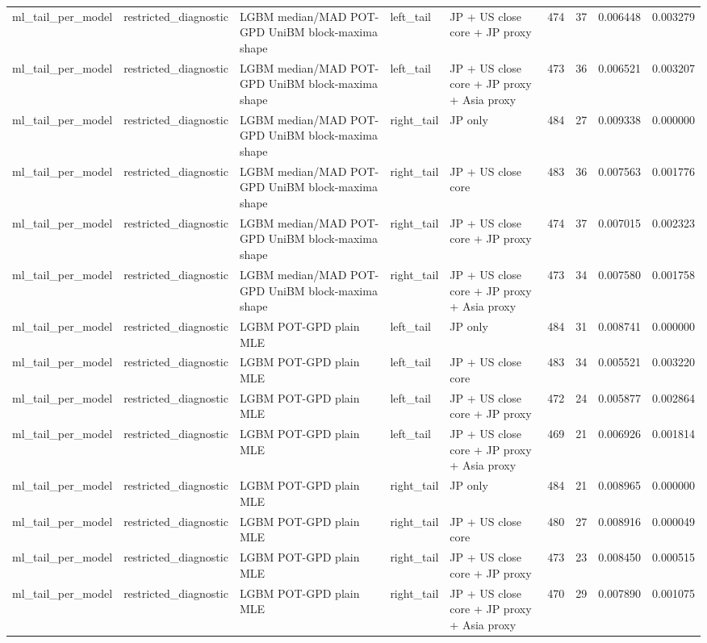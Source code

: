 \begin{tabular}{lllllrrrr}
ml\_tail\_per\_model & restricted\_diagnostic & LGBM median/MAD POT-GPD UniBM block-maxima shape & left\_tail & JP + US close core + JP proxy & 474 & 37 & 0.006448 & 0.003279 \\
ml\_tail\_per\_model & restricted\_diagnostic & LGBM median/MAD POT-GPD UniBM block-maxima shape & left\_tail & JP + US close core + JP proxy + Asia proxy & 473 & 36 & 0.006521 & 0.003207 \\
ml\_tail\_per\_model & restricted\_diagnostic & LGBM median/MAD POT-GPD UniBM block-maxima shape & right\_tail & JP only & 484 & 27 & 0.009338 & 0.000000 \\
ml\_tail\_per\_model & restricted\_diagnostic & LGBM median/MAD POT-GPD UniBM block-maxima shape & right\_tail & JP + US close core & 483 & 36 & 0.007563 & 0.001776 \\
ml\_tail\_per\_model & restricted\_diagnostic & LGBM median/MAD POT-GPD UniBM block-maxima shape & right\_tail & JP + US close core + JP proxy & 474 & 37 & 0.007015 & 0.002323 \\
ml\_tail\_per\_model & restricted\_diagnostic & LGBM median/MAD POT-GPD UniBM block-maxima shape & right\_tail & JP + US close core + JP proxy + Asia proxy & 473 & 34 & 0.007580 & 0.001758 \\
ml\_tail\_per\_model & restricted\_diagnostic & LGBM POT-GPD plain MLE & left\_tail & JP only & 484 & 31 & 0.008741 & 0.000000 \\
ml\_tail\_per\_model & restricted\_diagnostic & LGBM POT-GPD plain MLE & left\_tail & JP + US close core & 483 & 34 & 0.005521 & 0.003220 \\
ml\_tail\_per\_model & restricted\_diagnostic & LGBM POT-GPD plain MLE & left\_tail & JP + US close core + JP proxy & 472 & 24 & 0.005877 & 0.002864 \\
ml\_tail\_per\_model & restricted\_diagnostic & LGBM POT-GPD plain MLE & left\_tail & JP + US close core + JP proxy + Asia proxy & 469 & 21 & 0.006926 & 0.001814 \\
ml\_tail\_per\_model & restricted\_diagnostic & LGBM POT-GPD plain MLE & right\_tail & JP only & 484 & 21 & 0.008965 & 0.000000 \\
ml\_tail\_per\_model & restricted\_diagnostic & LGBM POT-GPD plain MLE & right\_tail & JP + US close core & 480 & 27 & 0.008916 & 0.000049 \\
ml\_tail\_per\_model & restricted\_diagnostic & LGBM POT-GPD plain MLE & right\_tail & JP + US close core + JP proxy & 473 & 23 & 0.008450 & 0.000515 \\
ml\_tail\_per\_model & restricted\_diagnostic & LGBM POT-GPD plain MLE & right\_tail & JP + US close core + JP proxy + Asia proxy & 470 & 29 & 0.007890 & 0.001075 \\

\end{tabular}

